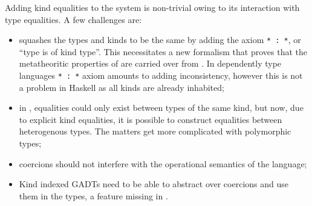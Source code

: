 \documentclass[manuscript,screen,nonacm]{acmart}
\begin{document}
Adding kind equalities to the system is non-trivial owing to its interaction with type equalities. A few challenges are:
\begin{itemize}
  \item \SFK squashes the types and kinds to be the same by adding the axiom \lstinline{* : *}, or ``type is of kind type''. This necessitates a new formalism that proves that the metatheoritic properties of \SFK are carried over from \SFC. In dependently type languages \lstinline{* : *} axiom amounts to adding inconsistency, however this is not a problem in Haskell as all kinds are already inhabited;
  \item in \SFC, equalities could only exist between types of the same kind, but now, due to explicit kind equalities, it is possible to construct equalities between heterogenous types. The matters get more complicated with polymorphic types;
  \item coercions should not interfere with the operational semantics of the language;
  \item Kind indexed GADTs need to be able to abstract over coercions and use them in the types, a feature missing in \SFC. 
\end{itemize}
\end{document}
